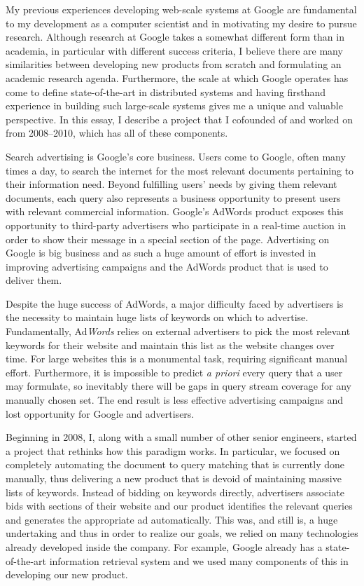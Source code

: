 \documentclass[12pt]{article}
\author{Matt Wytock}
\begin{document}
My previous experiences developing web-scale systems at Google are fundamental to my development as a computer scientist and in motivating my desire to pursue research. Although research at Google takes a somewhat different form than in academia, in particular with different success criteria, I believe there are many similarities between developing new products from scratch and formulating an academic research agenda. Furthermore, the scale at which Google operates has come to define state-of-the-art in distributed systems and having firsthand experience in building such large-scale systems gives me a unique and valuable perspective. In this essay, I describe a project that I cofounded of and worked on from 2008--2010, which has all of these components.

Search advertising is Google's core business. Users come to Google, often many times a day, to search the internet for the most relevant documents pertaining to their information need. Beyond fulfilling users' needs by giving them relevant documents, each query also represents a business opportunity to present users with relevant commercial information. Google's AdWords product exposes this opportunity to third-party advertisers who participate in a real-time auction in order to show their message in a special section of the page. Advertising on Google is big business and as such a huge amount of effort is invested in improving advertising campaigns and the AdWords product that is used to deliver them.

Despite the huge success of AdWords, a major difficulty faced by advertisers is the necessity to maintain huge lists of keywords on which to advertise. Fundamentally, Ad\emph{Words} relies on external advertisers to pick the most relevant keywords for their website and maintain this list as the website changes over time. For large websites this is a monumental task, requiring significant manual effort. Furthermore, it is impossible to predict \emph{a priori} every query that a user may formulate, so inevitably there will be gaps in query stream coverage for any manually chosen set. The end result is less effective advertising campaigns and lost opportunity for Google and advertisers.

Beginning in 2008, I, along with a small number of other senior engineers, started a project that rethinks how this paradigm works. In particular, we focused on completely automating the document to query matching that is currently done manually, thus delivering a new product that is devoid of maintaining massive lists of keywords. Instead of bidding on keywords directly, advertisers associate bids with sections of their website and our product identifies the relevant queries and generates the appropriate ad automatically. This was, and still is, a huge undertaking and thus in order to realize our goals, we relied on many technologies already developed inside the company. For example, Google already has a state-of-the-art information retrieval system and we used many components of this in developing our new product.
\end{document}
